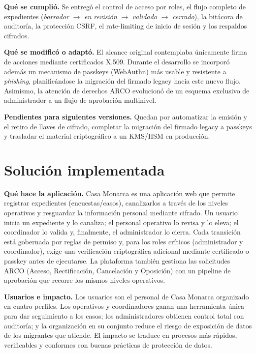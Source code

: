 \documentclass[10pt,letterpaper]{report}
\begin{document}
\textbf{Qué se cumplió.} Se entregó el control de acceso por roles, el flujo
completo de expedientes (\emph{borrador} $\rightarrow$ \emph{en revisión}
$\rightarrow$ \emph{validado} $\rightarrow$ \emph{cerrado}), la bitácora de
auditoría, la protección CSRF, el rate-limiting de inicio de sesión y los
respaldos cifrados.

\textbf{Qué se modificó o adaptó.} El alcance original contemplaba únicamente
firma de acciones mediante certificados X.509. Durante el desarrollo se
incorporó además un mecanismo de passkeys (WebAuthn) más usable y resistente a
\emph{phishing}, planificándose la migración del firmado legacy hacia este nuevo
flujo. Asimismo, la atención de derechos ARCO evolucionó de un esquema
exclusivo de administrador a un flujo de aprobación multinivel.

\textbf{Pendientes para siguientes versiones.} Quedan por automatizar la emisión
y el retiro de llaves de cifrado, completar la migración del firmado legacy a
passkeys y trasladar el material criptográfico a un KMS/HSM en producción.

\section{Solución implementada}

\textbf{Qué hace la aplicación.} Casa Monarca es una aplicación web que permite
registrar expedientes (encuestas/casos), canalizarlos a través de los niveles
operativos y resguardar la información personal mediante cifrado. Un usuario
inicia un expediente y lo canaliza; el personal operativo lo revisa y lo eleva;
el coordinador lo valida y, finalmente, el administrador lo cierra. Cada
transición está gobernada por reglas de permiso y, para los roles críticos
(administrador y coordinador), exige una verificación criptográfica adicional
mediante certificado o passkey antes de ejecutarse. La plataforma también
gestiona las solicitudes ARCO (Acceso, Rectificación, Cancelación y Oposición)
con un pipeline de aprobación que recorre los mismos niveles operativos.

\textbf{Usuarios e impacto.} Los usuarios son el personal de Casa Monarca
organizado en cuatro perfiles. Los operativos y coordinadores ganan una
herramienta única para dar seguimiento a los casos; los administradores obtienen
control total con auditoría; y la organización en su conjunto reduce el riesgo
de exposición de datos de los migrantes que atiende. El impacto se traduce en
procesos más rápidos, verificables y conformes con buenas prácticas de
protección de datos.
\end{document}
